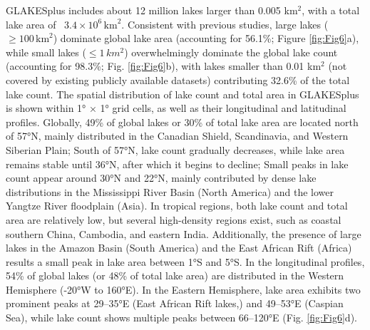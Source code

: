 \documentclass[preprint,12pt,authoryear]{elsarticle}
\begin{document}
GLAKESplus includes about 12 million lakes larger than 0.005 km$^2$, with a total lake area of ~$3.4 \times 10^6\, \text{km}^2$. Consistent with previous studies, large lakes ($\ge 100\, \text{km}^2$) dominate global lake area (accounting for 56.1\%; Figure \ref{fig:Fig6}a), while small lakes ($\le 1\, km^2$) overwhelmingly dominate the global lake count (accounting for 98.3\%; Fig. \ref{fig:Fig6}b), with lakes smaller than 0.01 km$^2$ (not covered by existing publicly available datasets) contributing 32.6\% of the total lake count. The spatial distribution of lake count and total area in GLAKESplus is shown within 1° × 1° grid cells, as well as their longitudinal and latitudinal profiles. Globally, 49\% of global lakes or 30\% of total lake area are located north of 57°N, mainly distributed in the Canadian Shield, Scandinavia, and Western Siberian Plain; South of 57°N, lake count gradually decreases, while lake area remains stable until 36°N, after which it begins to decline; Small peaks in lake count appear around 30°N and 22°N, mainly contributed by dense lake distributions in the Mississippi River Basin (North America) and the lower Yangtze River floodplain (Asia). In tropical regions, both lake count and total area are relatively low, but several high-density regions exist, such as coastal southern China, Cambodia, and eastern India. Additionally, the presence of large lakes in the Amazon Basin (South America) and the East African Rift (Africa) results a small peak in lake area between 1°S and 5°S. In the longitudinal profiles, 54\% of global lakes (or 48\% of total lake area) are distributed in the Western Hemisphere (-20°W to 160°E). In the Eastern Hemisphere, lake area exhibits two prominent peaks at 29–35°E (East African Rift lakes,) and 49–53°E (Caspian Sea), while lake count shows multiple peaks between 66–120°E (Fig. \ref{fig:Fig6}d).
\end{document}
